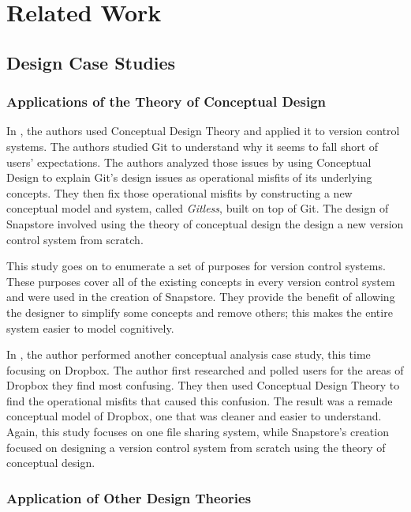 \chapter{Related Work}

\section{Design Case Studies}

\subsection{Applications of the Theory of Conceptual Design}

In \cite{RossoJackson}, the authors used Conceptual Design Theory and applied it to version control systems. The authors studied Git to understand why it seems to fall short of users' expectations. The authors analyzed those issues by using Conceptual Design to explain Git's design issues as operational misfits of its underlying concepts. They then fix those operational misfits by constructing a new conceptual model and system, called \textit{Gitless}, built on top of Git. The design of Snapstore involved using the theory of conceptual design the design a new version control system from scratch.

This study \cite{RossoJackson} goes on to enumerate a set of purposes for version control systems. These purposes cover all of the existing concepts in every version control system and were used in the creation of Snapstore. They provide the benefit of allowing the designer to simplify some concepts and remove others; this makes the entire system easier to model cognitively. 

In \cite{Zhang}, the author performed another conceptual analysis case study, this time focusing on Dropbox. The author first researched and polled users for the areas of Dropbox they find most confusing. They then used Conceptual Design Theory to find the operational misfits that caused this confusion. The result was a remade conceptual model of Dropbox, one that was cleaner and easier to understand. Again, this study focuses on one file sharing system, while Snapstore's creation focused on designing a version control system from scratch using the theory of conceptual design.

\subsection{Application of Other Design Theories}

